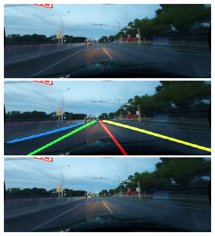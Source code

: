 \documentclass[runningheads]{llncs}
\begin{document}
\begin{figure}[!htb]
	\includegraphics[width=\linewidth]{result/00810.jpg}
	\endminipage\hfill
	\includegraphics[width=\linewidth]{result/00810-lane.jpg}
	\endminipage\hfill
	\includegraphics[width=\linewidth]{result/00810-obj.jpg}
	\endminipage


\end{figure}
\end{document}
